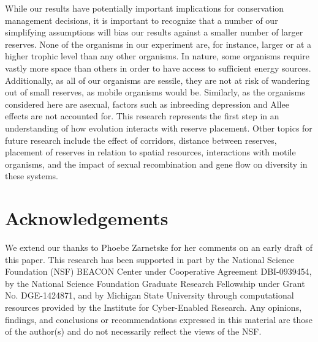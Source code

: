 \documentclass[letterpaper]{article}
\begin{document}
	While our results have potentially important implications for conservation management decisions, it is important to recognize that a number of our simplifying assumptions will bias our results against a smaller number of larger reserves. None of the organisms in our experiment are, for instance, larger or at a higher trophic level than any other organisms. In nature, some organisms require vastly more space than others in order to have access to sufficient energy sources. Additionally, as all of our organisms are sessile, they are not at risk of wandering out of small reserves, as mobile organisms would be. Similarly, as the organisms considered here are asexual, factors such as inbreeding depression and Allee effects are not accounted for. This research represents the first step in an understanding of how evolution interacts with reserve placement. Other topics for future research include the effect of corridors, distance between reserves, placement of reserves in relation to spatial resources, interactions with motile organisms, and the impact of sexual recombination and gene flow on diversity in these systems. 

\section{Acknowledgements}

We extend our thanks to Phoebe Zarnetske for her comments on an early draft of this paper. This research has been supported in part by the National Science Foundation (NSF) BEACON Center under Cooperative Agreement DBI-0939454, by the National Science Foundation Graduate Research Fellowship under Grant No. DGE-1424871, and by Michigan State University through computational resources provided by the Institute for Cyber-Enabled Research. Any opinions, findings, and conclusions or recommendations expressed in this material are those of the author(s) and do not necessarily reflect the views of the NSF.




\end{document}
